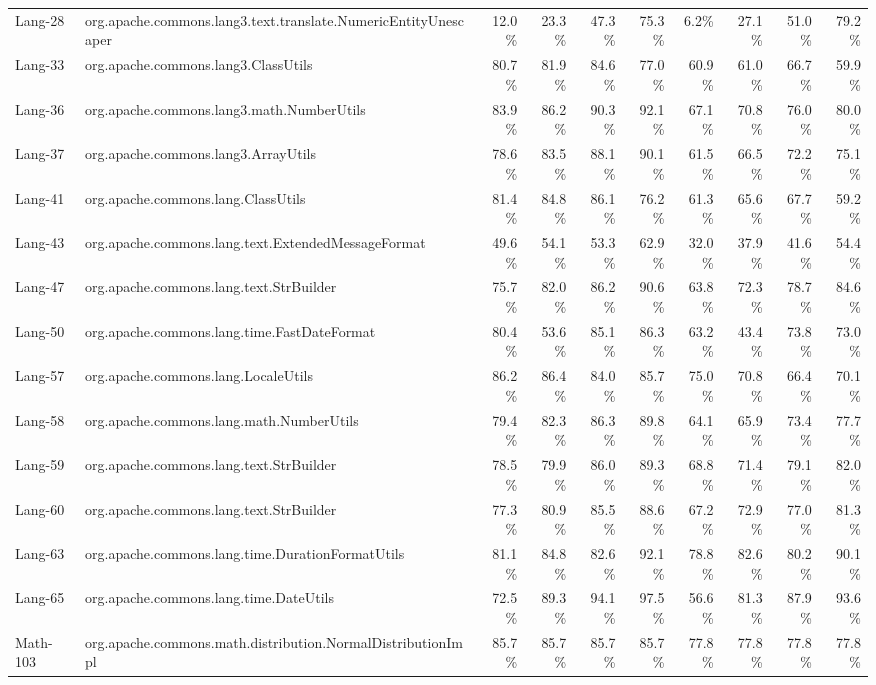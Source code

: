 \begin{tabular}{ ll rrrr rrrr}
Lang-28 &  org.apache.commons.lang3.text.translate.NumericEntityUnescaper &  12.0\% &  23.3\% &  47.3\% &  75.3\% &  6.2\% &  27.1\% &  51.0\% &  79.2\%\\ 
Lang-33 &  org.apache.commons.lang3.ClassUtils &  80.7\% &  81.9\% &  84.6\% &  77.0\% &  60.9\% &  61.0\% &  66.7\% &  59.9\%\\ 
Lang-36 &  org.apache.commons.lang3.math.NumberUtils &  83.9\% &  86.2\% &  90.3\% &  92.1\% &  67.1\% &  70.8\% &  76.0\% &  80.0\%\\ 
Lang-37 &  org.apache.commons.lang3.ArrayUtils &  78.6\% &  83.5\% &  88.1\% &  90.1\% &  61.5\% &  66.5\% &  72.2\% &  75.1\%\\ 
Lang-41 &  org.apache.commons.lang.ClassUtils &  81.4\% &  84.8\% &  86.1\% &  76.2\% &  61.3\% &  65.6\% &  67.7\% &  59.2\%\\ 
Lang-43 &  org.apache.commons.lang.text.ExtendedMessageFormat &  49.6\% &  54.1\% &  53.3\% &  62.9\% &  32.0\% &  37.9\% &  41.6\% &  54.4\%\\ 
Lang-47 &  org.apache.commons.lang.text.StrBuilder &  75.7\% &  82.0\% &  86.2\% &  90.6\% &  63.8\% &  72.3\% &  78.7\% &  84.6\%\\ 
Lang-50 &  org.apache.commons.lang.time.FastDateFormat &  80.4\% &  53.6\% &  85.1\% &  86.3\% &  63.2\% &  43.4\% &  73.8\% &  73.0\%\\ 
Lang-57 &  org.apache.commons.lang.LocaleUtils &  86.2\% &  86.4\% &  84.0\% &  85.7\% &  75.0\% &  70.8\% &  66.4\% &  70.1\%\\ 
Lang-58 &  org.apache.commons.lang.math.NumberUtils &  79.4\% &  82.3\% &  86.3\% &  89.8\% &  64.1\% &  65.9\% &  73.4\% &  77.7\%\\ 
Lang-59 &  org.apache.commons.lang.text.StrBuilder &  78.5\% &  79.9\% &  86.0\% &  89.3\% &  68.8\% &  71.4\% &  79.1\% &  82.0\%\\ 
Lang-60 &  org.apache.commons.lang.text.StrBuilder &  77.3\% &  80.9\% &  85.5\% &  88.6\% &  67.2\% &  72.9\% &  77.0\% &  81.3\%\\ 
Lang-63 &  org.apache.commons.lang.time.DurationFormatUtils &  81.1\% &  84.8\% &  82.6\% &  92.1\% &  78.8\% &  82.6\% &  80.2\% &  90.1\%\\ 
Lang-65 &  org.apache.commons.lang.time.DateUtils &  72.5\% &  89.3\% &  94.1\% &  97.5\% &  56.6\% &  81.3\% &  87.9\% &  93.6\%\\ 
Math-103 &  org.apache.commons.math.distribution.NormalDistributionImpl &  85.7\% &  85.7\% &  85.7\% &  85.7\% &  77.8\% &  77.8\% &  77.8\% &  77.8\%\\ 

\end{tabular}
